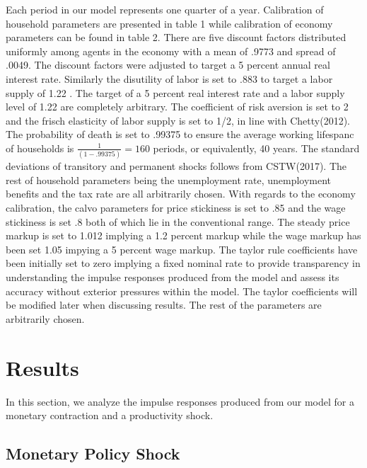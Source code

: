 \documentclass[titlepage]{\econtex}\providecommand{\texname}{BufferStockTheory}
\begin{document}
Each period in our model represents one quarter of a year. Calibration of household parameters are presented in table 1 while calibration of economy parameters can be found in table 2. There are five discount factors distributed uniformly among agents in the economy with a mean of .9773 and spread of .0049. The discount factors were adjusted to target a 5 percent annual real interest rate. Similarly the disutility of labor is set to .883 to target a labor supply of 1.22 . The target of a 5 percent real interest rate and a labor supply level of 1.22 are completely arbitrary.  The coefficient of risk aversion is set to 2 and the frisch elasticity of labor supply is set to 1/2, in line with Chetty(2012).  The probability of death is set to .99375 to ensure the average working lifespanc of households is $ \frac{1}{(1-.99375)} = 160$ periods, or equivalently, 40 years.  The standard deviations of transitory and permanent shocks follows from CSTW(2017). The rest of household parameters being the unemployment rate, unemployment benefits and the tax rate are all arbitrarily chosen. With regards to the economy calibration, the calvo parameters for price stickiness is set to .85 and the wage stickiness is set .8 both of which lie in the conventional range. The steady price markup is set to 1.012 implying a 1.2 percent markup while the wage markup has been set 1.05 impying a 5 percent wage markup. The taylor rule coefficients have been initially set to zero implying a fixed nominal rate to provide transparency in understanding the impulse responses produced from the model and assess its accuracy without exterior pressures within the model. The taylor coefficients will be modified later when discussing results. The rest of the parameters are arbitrarily chosen. 






\hypertarget{Results}{}
\section{Results}

In this section, we analyze the impulse responses produced from our model for a monetary contraction and a productivity shock.


\hypertarget{Monetary Policy Shock}{}
\subsection{Monetary Policy Shock}
\end{document}
